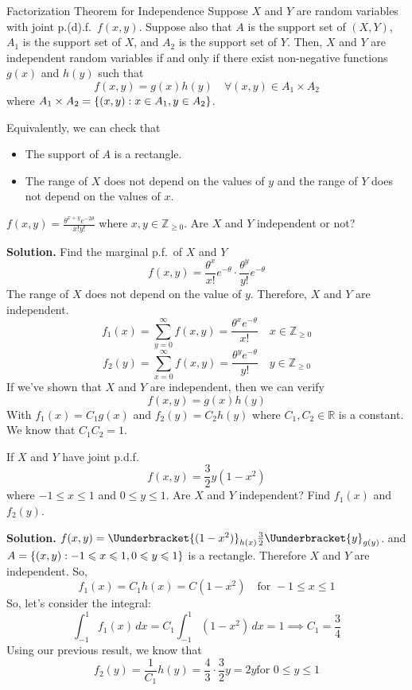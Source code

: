 \begin{Theorem}{Factorization Theorem for Independence}{}
    Suppose $ X $ and $ Y $ are random variables
    with joint p.(d).f.\ $ f(x,y) $. Suppose
    also that $ A $ is the support set of $ (X,Y) $,
    $ A_1 $ is the support set of $ X $,
    and $ A_2 $ is the support set of $ Y $. Then,
    $ X $ and $ Y $ are independent random variables
    if and only if there exist non-negative functions
    $ g(x) $ and $ h(y) $ such that
    \[ f(x,y)=g(x)h(y)\quad\forall(x,y)\in A_1\times A_2 \]
    where $ A_1\times A_2=\{(x,y):x\in A_1,y\in A_2\} $.
\end{Theorem}
\begin{Remark}{}{}
    Equivalently, we can check that
    \begin{itemize}
        \item The support of $ A $ is a rectangle.
        \item The range of $ X $ does not depend on the values
              of $ y $ and the range of $ Y $ does not depend on the values of $ x $.
    \end{itemize}
\end{Remark}

\begin{Example}{}{}
    $ \displaystyle f(x,y)=\frac{\theta^{x+y}e^{-2\theta}}{x!y!} $
    where $ x,y\in\mathbb{Z}_{\geqslant 0} $. Are $ X $ and $ Y $
    independent or not?

    \textbf{Solution.} Find the marginal p.f.\ of $ X $ and $ Y $
    \[ f(x,y)=\frac{\theta^x}{x!} e^{-\theta}\cdot \frac{\theta^y}{y!}e^{-\theta}  \]
    The range of $ X $ does not depend on the value of $ y $. Therefore,
    $ X $ and $ Y $ are independent.
    \[ f_1(x)=\sum\limits_{y=0}^{\infty} f(x,y)=\frac{\theta^xe^{-\theta}}{x!}\quad x\in
        \mathbb{Z}_{\geqslant 0} \]
    \[ f_2(y)=\sum\limits_{x=0}^{\infty} f(x,y)=\frac{\theta^ye^{-\theta}}{y!}\quad y\in
        \mathbb{Z}_{\geqslant 0} \]
    If we've shown that $ X $ and $ Y $ are independent, then we can verify
    \[ f(x,y)=g(x)h(y) \]
    With $ f_1(x)=C_1 g(x) $ and $ f_2(y)=C_2 h(y) $
    where $ C_1,C_2\in\mathbb{R} $ is a constant. We know that $ C_1C_2=1 $.
\end{Example}

\begin{Example}{}{}
    If $ X $ and $ Y $ have joint p.d.f.\
    \[ f(x,y)=\frac{3}{2} y(1-x^2) \]
    where $ -1\leqslant x\leqslant 1 $ and $ 0\leqslant y\leqslant 1 $.
    Are $ X $ and $ Y $ independent? Find $ f_1(x) $ and $ f_2(y) $.

    \textbf{Solution.}
    $ f(x,y)=\Uunderbracket{(1-x^2)}_{h(x)}\frac{3}{2} \Uunderbracket{y}_{g(y)} $.
    and $A =\{(x,y):-1\leqslant x\leqslant 1,0\leqslant y\leqslant 1\} $
    is a rectangle. Therefore $ X $ and $ Y $ are independent. So,
    \[ f_1(x)=C_1h(x)=C(1-x^2)\quad\text{for }-1\leqslant x\leqslant 1 \]
    So, let's consider the integral:
    \[ \int_{-1}^{1} f_1(x)\, d{x} =C_1
        \int_{-1}^{1} (1-x^2)\, d{x} =1
        \implies C_1=\frac{3}{4} \]
    Using our previous result, we know that
    \[ f_2(y)=\frac{1}{C_1} h(y)=\frac{4}{3}\cdot \frac{3}{2} y=2y
        \text{for }0\leqslant y\leqslant 1 \]
\end{Example}

